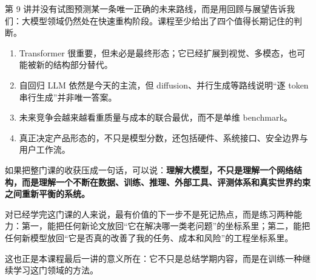 \documentclass[a4paper]{article}
\begin{document}
第 9 讲并没有试图预测某一条唯一正确的未来路线，而是用回顾与展望告诉我们：大模型领域仍然处在快速重构阶段。课程至少给出了四个值得长期记住的判断。

\begin{enumerate}
\item Transformer 很重要，但未必是最终形态；它已经扩展到视觉、多模态，也可能被新的结构部分替代。
\item 自回归 LLM 依然是今天的主流，但 diffusion、并行生成等路线说明“逐 token 串行生成”并非唯一答案。
\item 未来竞争会越来越看重质量与成本的联合最优，而不是单维 benchmark。
\item 真正决定产品形态的，不只是模型分数，还包括硬件、系统接口、安全边界与用户工作流。
\end{enumerate}

如果把整门课的收获压成一句话，可以说：\textbf{理解大模型，不只是理解一个网络结构，而是理解一个不断在数据、训练、推理、外部工具、评测体系和真实世界约束之间重新平衡的系统。}

对已经学完这门课的人来说，最有价值的下一步不是死记热点，而是练习两种能力：第一，能把任何新论文放回“它在解决哪一类老问题”的坐标系里；第二，能把任何新模型放回“它是否真的改善了我的任务、成本和风险”的工程坐标系里。

这也正是本课程最后一讲的意义所在：它不只是总结学期内容，而是在训练一种继续学习这门领域的方法。
\end{document}
